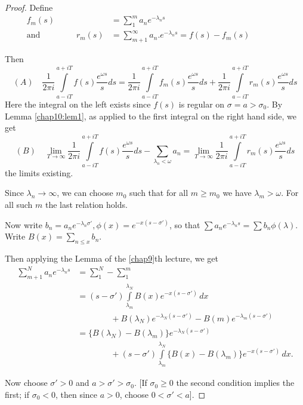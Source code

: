 \begin{proof}
Define\pageoriginale 
\begin{align*}
f_m(s) & = \sum\limits^m_1 a_n e^{-\lambda_ns}\\
\text{and } \qquad \qquad r_m (s) & = \sum\limits^\infty_{m+1} a_n.
e^{-\lambda_ns} = f(s) - f_m(s)
\qquad \qquad 
\end{align*}

Then
$$
(A) \quad \frac{1}{2\pi i} \int\limits^{a+iT}_{a-iT} f(s) \frac{e^{\omega
    s}}{s} ds = \frac{1}{2\pi i} \int\limits^{a+iT}_{a-iT} f_m (s)
\frac{e^{\omega s}}{s} ds + \frac{1}{2\pi i} \int\limits^{a+iT}_{a-iT}
r_m (s) \frac{e^{\omega s}}{s} ds
$$
Here the integral on the left exists since $f(s)$ is regular on
$\sigma = a > \sigma_0$. By Lemma \ref{chap10:lem1}, as applied to the first integral
on the right hand side, we get
$$
(B) \quad \lim\limits_{T \to \infty} \frac{1}{2 \pi i}
\int\limits^{a+iT}_{a-iT} f(s) \frac{e^{\omega s}}{s} ds -
\sum\limits_{\lambda_n < \omega} a_n = \lim\limits_{T\to\infty}
\frac{1}{2\pi i} \int\limits^{a+iT}_{a-iT} r_m (s) \frac{e^{\omega
    s}}{s} ds
$$
the limits existing.

Since $\lambda_n \to \infty$, we can choose $m_0$ such that for all $m
\geq m_0$ we have $\lambda_m > \omega$. For all such $m$ the last
relation holds.

Now write $b_n = a_n e^{-\lambda_n \sigma'}, \phi (x) =
e^{-x(s-\sigma')} $, so that $\sum a_n e^{-\lambda_ns} = \sum b_n \phi
(\lambda)$. Write $B(x) = \sum\limits_{n \leq x} b_n$.

Then applying the Lemma of the \ref{chap9}th lecture, we get
\begin{align*}
\sum^N_{m+1} a_n e^{-\lambda_n s} & = \sum^N_1 - \sum^m_1 \\
& = (s-\sigma') \int\limits^{\lambda_N}_{\lambda_m} B(x)
e^{-x(s-\sigma')} \, dx \\
& \qquad  \qquad + B (\lambda_N) e^{-\lambda_N(s-\sigma')}
-B(m)e^{-\lambda_m(s-\sigma')} \\
& = \{B(\lambda_N) - B (\lambda_m)\} e^{-\lambda_N(s-\sigma')}\\
& \qquad \qquad +(s-\sigma')
  \int\limits^{\lambda_N}_{\lambda_m} \{B(x)  -
B(\lambda_m)\} e^{-x(s-\sigma')} \, dx. 
\end{align*}\pageoriginale 

Now choose $\sigma'>0$ and $a > \sigma' > \sigma_0$. [If $\sigma_0
  \geq 0$ the second condition implies the first; if $\sigma_0 < 0$,
  then since $a>0$, choose $0< \sigma'<a$].


\end{proof}
